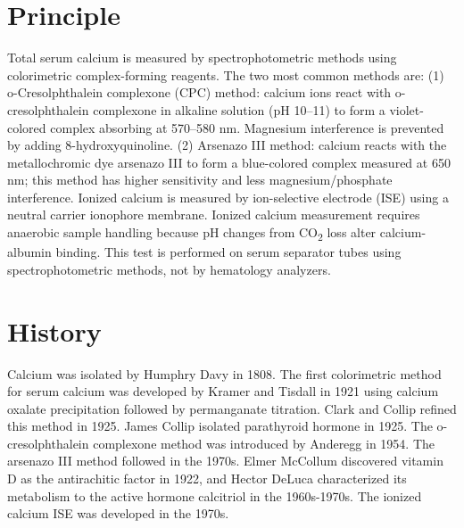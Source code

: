 \section*{Principle}
Total serum calcium is measured by spectrophotometric methods using colorimetric complex-forming reagents. The two most common methods are: (1) o-Cresolphthalein complexone (CPC) method: calcium ions react with o-cresolphthalein complexone in alkaline solution (pH 10--11) to form a violet-colored complex absorbing at 570--580 nm. Magnesium interference is prevented by adding 8-hydroxyquinoline. (2) Arsenazo III method: calcium reacts with the metallochromic dye arsenazo III to form a blue-colored complex measured at 650 nm; this method has higher sensitivity and less magnesium/phosphate interference. Ionized calcium is measured by ion-selective electrode (ISE) using a neutral carrier ionophore membrane. Ionized calcium measurement requires anaerobic sample handling because pH changes from CO\textsubscript{2} loss alter calcium-albumin binding. This test is performed on serum separator tubes using spectrophotometric methods, not by hematology analyzers.

\section*{History}
Calcium was isolated by Humphry Davy in 1808. The first colorimetric method for serum calcium was developed by Kramer and Tisdall in 1921 using calcium oxalate precipitation followed by permanganate titration. Clark and Collip refined this method in 1925. James Collip isolated parathyroid hormone in 1925. The o-cresolphthalein complexone method was introduced by Anderegg in 1954. The arsenazo III method followed in the 1970s. Elmer McCollum discovered vitamin D as the antirachitic factor in 1922, and Hector DeLuca characterized its metabolism to the active hormone calcitriol in the 1960s-1970s. The ionized calcium ISE was developed in the 1970s.

